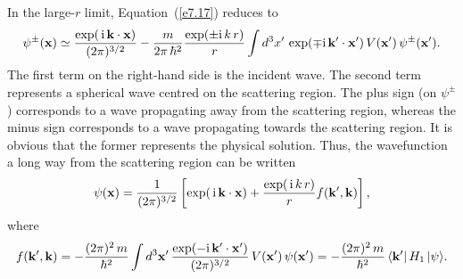 In the large-$r$ limit, Equation~(\ref{e7.17}) reduces to
\begin{equation}
\psi^\pm({\bf x}) \simeq \frac{\exp(\,{\rm i}\,{\bf k}\cdot{\bf x})}{
(2\pi)^{3/2}} -\frac{m}{2\pi\,\hbar^2} \frac{\exp(\pm{\rm i}\,k\,r)}{r}
\int d^3 x'\, \exp(\mp {\rm i} \,{\bf k}' \cdot {\bf x}')\,
V({\bf x}')\, \psi^\pm  ({\bf x}').
\end{equation}
The first term on the right-hand side is the incident wave. The second term
represents a spherical wave centred on the scattering region. The
plus sign (on $\psi^\pm$) corresponds to a wave propagating away from the
scattering region, whereas the minus sign corresponds to a
wave propagating towards the scattering region. It is obvious that
the former represents the physical solution. 
Thus, the wavefunction a long way from the scattering region can be
written
\begin{equation}
\psi({\bf x}) = \frac{1}{(2\pi)^{3/2}} \left[\exp(\,{\rm i}\,{\bf k}\cdot{\bf x}) + \frac{\exp(\,{\rm i}\,k\,r)}{r} f({\bf k}', {\bf k}) \right],
\end{equation}
where
\begin{equation}
f({\bf k}', {\bf k}) = - \frac{(2\pi)^2 \,m}{\hbar^2} \int d^3{\bf x}' \,
\frac{\exp(-{\rm i}\,{\bf k}'\cdot {\bf x}'  ) }{(2\pi)^{3/2}}\, V({\bf x}')\,\psi({\bf x}')  = - \frac{(2\pi)^2 \,m}{\hbar^2}\, \langle {\bf k}'|\,H_1\,|\psi\rangle.
\end{equation}

